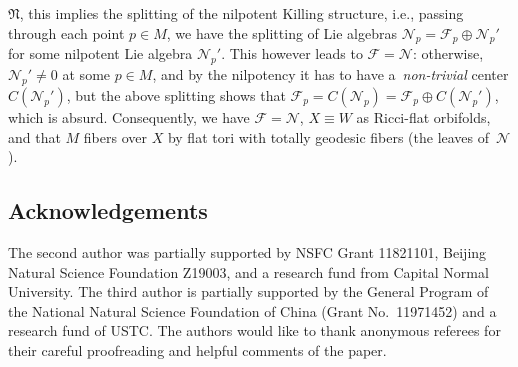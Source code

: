\documentclass[10pt,a4paper]{amsart}
\numberwithin{equation}{section}
\begin{document}
 $\mathfrak{N}$, this implies the splitting of the nilpotent Killing structure,
 i.e., passing through each point $p\in M$, we have the splitting of Lie algebras
 $\mathcal{N}_p=\mathcal{F}_p\oplus \mathcal{N}_p'$ for some nilpotent Lie
 algebra $\mathcal{N}_p'$. This however leads to $\mathcal{F}=\mathcal{N}$:
 otherwise, $\mathcal{N}_p'\not= 0$ at some $p\in M$, and by the nilpotency it
 has to have a~\emph{non-trivial} center $C(\mathcal{N}_p')$, but the above
 splitting shows that $\mathcal{F}_p =C(\mathcal{N}_p)=\mathcal{F}_p\oplus
 C(\mathcal{N}_p')$, which is absurd. Consequently, we have
 $\mathcal{F}=\mathcal{N}$, $X\equiv W$ as Ricci-flat orbifolds, and that
 $M$ fibers over $X$ by flat tori with totally geodesic fibers (the leaves of~$\mathcal{N}$).

\subsection*{Acknowledgements}
The second author was partially supported by NSFC Grant 11821101, Beijing
Natural Science Foundation Z19003, and a research fund from Capital Normal
University. The third author is partially supported by the General Program of
the National Natural Science Foundation of China (Grant No.~11971452) and a
research fund of USTC. The authors would like to thank anonymous referees for
their careful proofreading and helpful comments of the paper.

\end{document}
